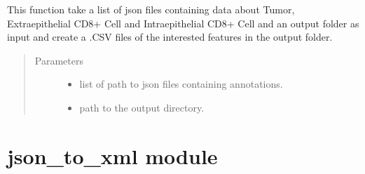 \documentclass[letterpaper,10pt,english]{sphinxmanual}
\begin{document}
\begin{fulllineitems}
\label{\detokenize{json_to_csv:json_to_csv.convert_json_to_csv}}
\sphinxAtStartPar
This function take a list of json files containing data about Tumor, Extraepithelial CD8+ Cell and
Intraepithelial CD8+ Cell and an output folder as input and create a .CSV files of the interested features
in the output folder.
\begin{quote}\begin{description}
\item[{Parameters}] \leavevmode\begin{itemize}
\item {} 
\sphinxAtStartPar
{} \textendash{} list of path to json files containing annotations.

\item {} 
\sphinxAtStartPar
{} \textendash{} path to the output directory.

\end{itemize}

\end{description}\end{quote}

\end{fulllineitems}



\section{json\_to\_xml module}
\label{\detokenize{json_to_xml:module-json_to_xml}}\label{\detokenize{json_to_xml:json-to-xml-module}}\label{\detokenize{json_to_xml::doc}}
\end{document}
